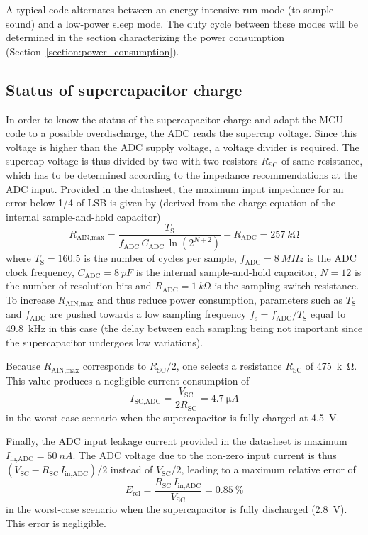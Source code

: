 \documentclass{EPL-master-thesis-covers-EN}
\newcommand{\te}[1]{\textrm{#1}}
\begin{document}
A typical code alternates between an energy-intensive run mode (to sample sound) and a low-power sleep mode. The duty cycle between these modes will be determined in the section characterizing the power consumption (Section~\ref{section:power_consumption}).

\subsection*{Status of supercapacitor charge}

In order to know the status of the supercapacitor charge and adapt the MCU code to a possible overdischarge, the ADC reads the supercap voltage. Since this voltage is higher than the ADC supply voltage, a voltage divider is required. The supercap voltage is thus divided by two with two resistors $R_\te{SC}$ of same resistance, which has to be determined according to the impedance recommendations at the ADC input. Provided in the datasheet, the maximum input impedance for an error below 1/4 of LSB is given by (derived from the charge equation of the internal sample-and-hold capacitor)
\[
 R_\te{AIN,max} = \frac{T_\te{S}}{f_\te{ADC}\,C_\te{ADC}\,\ln(2^{N+2})} - R_\te{ADC} = \SI{257}{k\ohm}
\]
where $T_\te{S} = 160.5$ is the number of cycles per sample, $f_\te{ADC} = \SI{8}{MHz}$ is the ADC clock frequency, $C_\te{ADC} = \SI{8}{pF}$ is the internal sample-and-hold capacitor, $N=12$ is the number of resolution bits and $R_\te{ADC} = \SI{1}{k\ohm}$ is the sampling switch resistance. To increase $R_\te{AIN,max}$ and thus reduce power consumption, parameters such as $T_\te{S}$ and $f_\te{ADC}$ are pushed towards a low sampling frequency $f_\te{s} = f_\te{ADC}/T_\te{S}$ equal to \SI{49.8}{kHz} in this case (the delay between each sampling being not important since the supercapacitor undergoes low variations).

Because $R_\te{AIN,max}$ corresponds to $R_\te{SC}/2$, one selects a resistance $R_\te{SC}$ of \SI{475}{k\ohm}. This value produces a negligible current consumption of
\[
 I_\te{SC,ADC} = \frac{V_\te{SC}}{2R_\te{SC}} = \SI{4.7}{\micro A}
\]
in the worst-case scenario when the supercapacitor is fully charged at \SI{4.5}{V}.

Finally, the ADC input leakage current provided in the datasheet is maximum $I_\te{in,ADC} = \SI{50}{nA}$. The ADC voltage due to the non-zero input current is thus $(V_\te{SC} - R_\te{SC}\,I_\te{in,ADC})/2$ instead of $V_\te{SC}/2$, leading to a maximum relative error of
\[
 E_\te{rel} = \frac{R_\te{SC}\,I_\te{in,ADC}}{V_\te{SC}} = \SI{0.85}{\%}
\]
in the worst-case scenario when the supercapacitor is fully discharged (\SI{2.8}{V}). This error is negligible.
\end{document}
